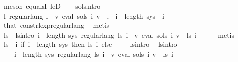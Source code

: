 \begin{isabellebody}
\ {\isacharparenleft}{\kern0pt}meson\ equals{}I\ leD{\isacharparenright}{\kern0pt}\isanewline
\ \ \isamarkupfalse%
\ sols{\isacharunderscore}{\kern0pt}intro\ \isamarkupfalse%
\ {\isachardoublequoteopen}{\isasymexists}l{\isachardot}{\kern0pt}\ regular{\isacharunderscore}{\kern0pt}lang\ l\ {\isasymand}\ {\isacharparenleft}{\kern0pt}{\isasymforall}v{\isachardot}{\kern0pt}\ eval\ {\isacharparenleft}{\kern0pt}sols\ i{\isacharparenright}{\kern0pt}\ v\ {\isacharequal}{\kern0pt}\ l{\isacharparenright}{\kern0pt}{\isachardoublequoteclose}\ \ {\isachardoublequoteopen}i\ {\isacharless}{\kern0pt}\ length\ sys{\isachardoublequoteclose}\ \ i\isanewline
\ \ \ \ \isamarkupfalse%
\ that\ const{\isacharunderscore}{\kern0pt}rlexp{\isacharunderscore}{\kern0pt}regular{\isacharunderscore}{\kern0pt}lang\ \isamarkupfalse%
\ metis\isanewline
\ \ \isamarkupfalse%
\ \isamarkupfalse%
\ ls\ \ ls{\isacharunderscore}{\kern0pt}intro{\isacharcolon}{\kern0pt}\ {\isachardoublequoteopen}{\isasymforall}i\ {\isacharless}{\kern0pt}\ length\ sys{\isachardot}{\kern0pt}\ regular{\isacharunderscore}{\kern0pt}lang\ {\isacharparenleft}{\kern0pt}ls\ i{\isacharparenright}{\kern0pt}\ {\isasymand}\ {\isacharparenleft}{\kern0pt}{\isasymforall}v{\isachardot}{\kern0pt}\ eval\ {\isacharparenleft}{\kern0pt}sols\ i{\isacharparenright}{\kern0pt}\ v\ {\isacharequal}{\kern0pt}\ ls\ i{\isacharparenright}{\kern0pt}{\isachardoublequoteclose}\isanewline
\ \ \ \ \isamarkupfalse%
\ metis\isanewline
\ \ \isamarkupfalse%
\ {\isacharquery}{\kern0pt}ls{\isacharprime}{\kern0pt}\ {\isacharequal}{\kern0pt}\ {\isachardoublequoteopen}{\isasymlambda}i{\isachardot}{\kern0pt}\ if\ i\ {\isacharless}{\kern0pt}\ length\ sys\ then\ ls\ i\ else\ {\isacharbraceleft}{\kern0pt}{\isacharbraceright}{\kern0pt}{\isachardoublequoteclose}\isanewline
\ \ \isamarkupfalse%
\ ls{\isacharunderscore}{\kern0pt}intro\ \isamarkupfalse%
\ ls{\isacharprime}{\kern0pt}{\isacharunderscore}{\kern0pt}intro{\isacharcolon}{\kern0pt}\isanewline
\ \ \ \ {\isachardoublequoteopen}{\isacharparenleft}{\kern0pt}{\isasymforall}i\ {\isacharless}{\kern0pt}\ length\ sys{\isachardot}{\kern0pt}\ regular{\isacharunderscore}{\kern0pt}lang\ {\isacharparenleft}{\kern0pt}{\isacharquery}{\kern0pt}ls{\isacharprime}{\kern0pt}\ i{\isacharparenright}{\kern0pt}\ {\isasymand}\ {\isacharparenleft}{\kern0pt}{\isasymforall}v{\isachardot}{\kern0pt}\ eval\ {\isacharparenleft}{\kern0pt}sols\ i{\isacharparenright}{\kern0pt}\ v\ {\isacharequal}{\kern0pt}\ {\isacharquery}{\kern0pt}ls{\isacharprime}{\kern0pt}\ i{\isacharparenright}{\kern0pt}{\isacharparenright}{\kern0pt}\isanewline

\end{isabellebody}
